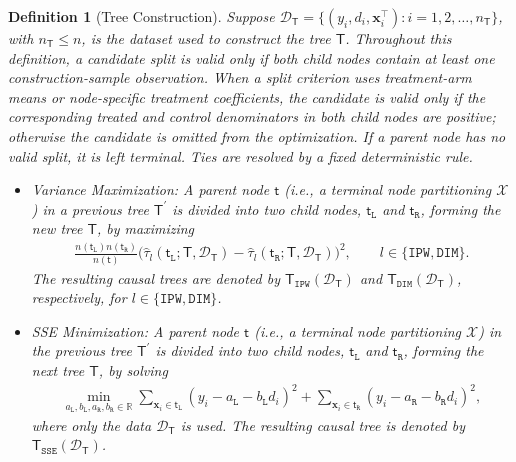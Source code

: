 \documentclass[10pt]{article}
\def\treeT{\mathsf{T}}
\def\nodet{\mathsf{t}}
\def\bx{\mathbf{x}}
\def\reals{\mathbb{R}}
\newtheorem{definition}{Definition}
\theoremstyle{definition}
\theoremstyle{remark}
\begin{document}
\begin{definition}[Tree Construction]\label{sa-defn: tree construction}
    Suppose $\mathcal{D}_{\treeT} = \{(y_i,d_i,\bx^\top_i):i=1,2,\dots,n_{\treeT}\}$, with $n_{\treeT}\leq n$, is the dataset used to construct the tree $\treeT$.
    Throughout this definition, a candidate split is valid only if both child nodes contain at least one construction-sample observation. When a split criterion uses treatment-arm means or node-specific treatment coefficients, the candidate is valid only if the corresponding treated and control denominators in both child nodes are positive; otherwise the candidate is omitted from the optimization. If a parent node has no valid split, it is left terminal. Ties are resolved by a fixed deterministic rule.
    \begin{itemize}
        \item \textit{Variance Maximization}: A parent node $\nodet$ (i.e., a terminal node partitioning $\mathcal{X}$) in a previous tree $\treeT^{\prime}$ is divided into two child nodes, $\nodet_{\mathtt{L}}$ and $\nodet_{\mathtt{R}}$, forming the new tree $\treeT$, by maximizing 
        \begin{align}\label{sa-eq: variance maximization} \frac{n(\nodet_{\mathtt{L}})n(\nodet_{\mathtt{R}})}{n(\nodet)}
            \Big(\hat\tau_l(\nodet_{\mathtt{L}}; \treeT,\mathcal{D}_{\treeT})
               - \hat\tau_l(\nodet_{\mathtt{R}}; \treeT,\mathcal{D}_{\treeT})\Big)^2,
            \qquad l \in \{\mathtt{IPW},\mathtt{DIM}\}.
        \end{align}
        The resulting causal trees are denoted by $\treeT_{\mathtt{IPW}}(\mathcal{D}_{\treeT})$ and $\treeT_{\mathtt{DIM}}(\mathcal{D}_{\treeT})$, respectively, for $l \in \{\mathtt{IPW},\mathtt{DIM}\}$.
        
        \item \textit{SSE Minimization}: A parent node $\nodet$ (i.e., a terminal node partitioning $\mathcal{X}$) in the previous tree $\treeT^{\prime}$ is divided into two child nodes, $\nodet_{\mathtt{L}}$ and $\nodet_{\mathtt{R}}$, forming the next tree $\treeT$, by solving
        \begin{align}\label{sa-eq: sse}
            \min_{a_{\mathtt{L}}, b_{\mathtt{L}}, a_{\mathtt{R}}, b_{\mathtt{R}} \in \reals}
            \sum_{\bx_i \in \nodet_{\mathtt{L}}} (y_i - a_{\mathtt{L}} - b_{\mathtt{L}} d_i)^2 + \sum_{\bx_i \in \nodet_{\mathtt{R}}} (y_i - a_{\mathtt{R}} - b_{\mathtt{R}} d_i)^2,
        \end{align}
        where only the data $\mathcal{D}_{\treeT}$ is used. The resulting causal tree is denoted by $\treeT_{\mathtt{SSE}}(\mathcal{D}_{\treeT})$.
    \end{itemize}
\end{definition}
\end{document}

